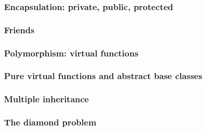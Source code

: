 \documentclass{slides}
\begin{document}
\begin{frame}
  \frametitle{Encapsulation: private, public, protected}

  \begin{center}
  \end{center}

\end{frame}

\begin{frame}
  \frametitle{Friends}
  
\end{frame}

\begin{frame}
  \frametitle{Polymorphism: virtual functions}
\end{frame}

\begin{frame}
  \frametitle{Pure virtual functions and abstract base classes}
  
\end{frame}

\begin{frame}
  \frametitle{Multiple inheritance}
  
\end{frame}

\begin{frame}
  \frametitle{The diamond problem}
  
\end{frame}
\end{document}
